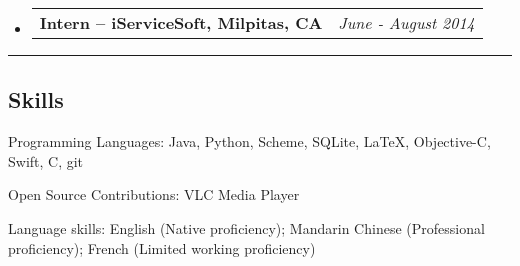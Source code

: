 \documentclass[10pt,letterpaper]{article}
\makeatletter
\newenvironment{indentsection}[1]%
{\begin{list}{}%
	{\setlength{\leftmargin}{#1}}%
	\item[]%
}
{\end{list}}
\newcommand{\headerrow}[2]
{\begin{tabular*}{\linewidth}{l@{\extracolsep{\fill}}r}
	#1 &
	#2 \\
\end{tabular*}}
\newcommand{\CPP}
{C\nolinebreak[4]\hspace{-.05em}\raisebox{.22ex}{\footnotesize\bf ++}}
\makeatother
\begin{document}
\begin{itemize}
	\item
	\headerrow
		{\textbf{Intern -- iServiceSoft, Milpitas, CA}}
		{\emph{June - August 2014}}

\end{itemize}

\hrule
\vspace{-0.4em}
\subsection*{Skills}

\begin{indentsection}{\parindent}
\begin{description*}
	\item[Programming Languages:]
	Java, Python, Scheme, SQLite, \LaTeX, Objective-C, Swift, \CPP, git
	\item[Open Source Contributions:]
	VLC Media Player
	\item[Language skills:] English (Native proficiency); Mandarin Chinese (Professional proficiency); French (Limited working proficiency)
\end{description*}
\end{indentsection}
\end{document}
